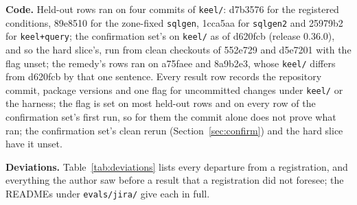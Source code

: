 \documentclass[sigconf, nonacm]{acmart}
\newcommand{\code}[1]{\texttt{#1}}
\begin{document}
\textbf{Code.} Held-out rows ran on four commits of \code{keel/}: d7b3576 for the registered conditions, 89e8510 for the zone-fixed \code{sqlgen}, 1cca5aa for \code{sqlgen2} and 25979b2 for \code{keel+query}; the confirmation set's on \code{keel/} as of d620fcb (release 0.36.0), and so the hard slice's, run from clean checkouts of 552e729 and d5e7201 with the flag unset; the remedy's rows ran on a75faee and 8a9b2e3, whose \code{keel/} differs from d620fcb by that one sentence. Every result row records the repository commit, package versions and one flag for uncommitted changes under \code{keel/} or the harness; the flag is set on most held-out rows and on every row of the confirmation set's first run, so for them the commit alone does not prove what ran; the confirmation set's clean rerun (Section~\ref{sec:confirm}) and the hard slice have it unset.

\textbf{Deviations.} Table~\ref{tab:deviations} lists every departure from a registration, and everything the author saw before a result that a registration did not foresee; the READMEs under \code{evals/jira/} give each in full.
\end{document}
